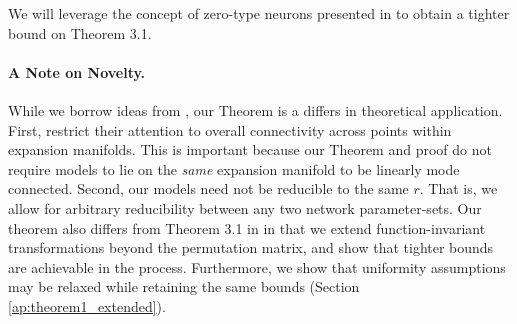 We will leverage the concept of zero-type neurons presented in \citep{simsek2021geometry} to obtain a tighter bound on Theorem 3.1. 

\paragraph{A Note on Novelty.} While we borrow ideas from \citet{simsek2021geometry}, our Theorem is a differs in theoretical application. 
First, \citet{simsek2021geometry} restrict their attention to overall connectivity across points within expansion manifolds. 
This is important because our Theorem and proof do not require models to lie on the \textit{same} expansion manifold to be linearly mode connected. 
Second, our models need not be reducible to the same $r$. 
That is, we allow for arbitrary reducibility between any two network parameter-sets. 
Our theorem also differs from Theorem 3.1 in \citep{entezari2021role} in that we extend function-invariant transformations beyond the permutation matrix, and show that tighter bounds are achievable in the process. Furthermore, we show that uniformity assumptions may be relaxed while retaining the same bounds (Section \ref{ap:theorem1_extended}).




